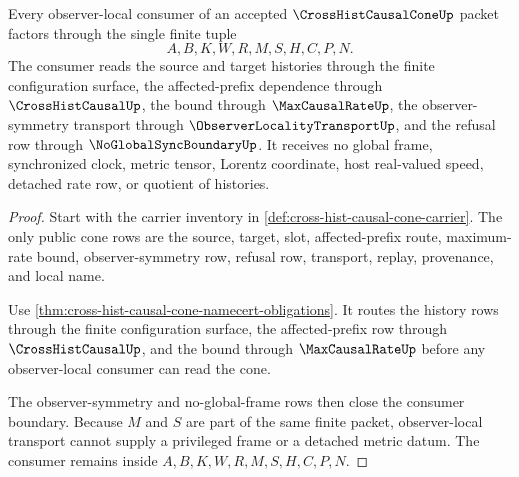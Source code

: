 \begin{theorem}
\label{thm:cross-hist-causal-cone-observer-local-boundary}
Every observer-local consumer of an accepted $\CrossHistCausalConeUp$ packet factors through the single finite tuple
$$
A,B,K,W,R,M,S,H,C,P,N.
$$
The consumer reads the source and target histories through the finite configuration surface, the affected-prefix dependence through $\CrossHistCausalUp$, the bound through $\MaxCausalRateUp$, the observer-symmetry transport through $\ObserverLocalityTransportUp$, and the refusal row through $\NoGlobalSyncBoundaryUp$. It receives no global frame, synchronized clock, metric tensor, Lorentz coordinate, host real-valued speed, detached rate row, or quotient of histories.
\end{theorem}
\begin{proof}
Start with the carrier inventory in \autoref{def:cross-hist-causal-cone-carrier}. The only public cone rows are the source, target, slot, affected-prefix route, maximum-rate bound, observer-symmetry row, refusal row, transport, replay, provenance, and local name.

Use \autoref{thm:cross-hist-causal-cone-namecert-obligations}. It routes the history rows through the finite configuration surface, the affected-prefix row through $\CrossHistCausalUp$, and the bound through $\MaxCausalRateUp$ before any observer-local consumer can read the cone.

The observer-symmetry and no-global-frame rows then close the consumer boundary. Because $M$ and $S$ are part of the same finite packet, observer-local transport cannot supply a privileged frame or a detached metric datum. The consumer remains inside $A,B,K,W,R,M,S,H,C,P,N$.
\end{proof}


